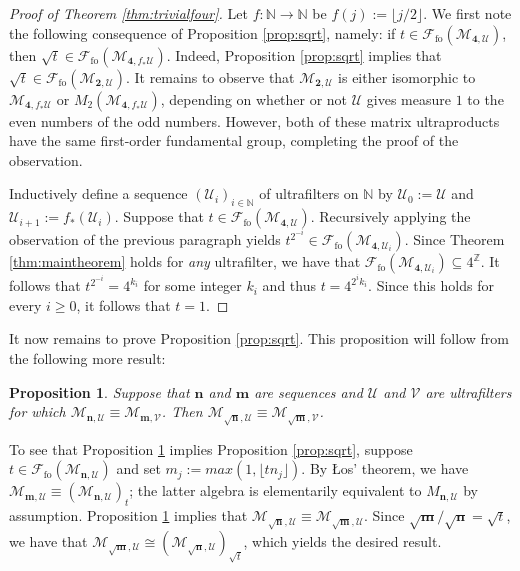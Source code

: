 \documentclass[12pt]{amsart}
\numberwithin{equation}{section}
\newtheorem{prop}[thm]{Proposition}
\theoremstyle{definition}
\newcommand{\N}{\mathbb{N}}
\newcommand{\Z}{\mathbb{Z}}
\def\cal{\mathcal}
\def\M{\mathcal{M}}
\newcommand\cU{{\cal U}}
\def \M{\mathcal{M}}
\begin{document}
\begin{proof}[Proof of Theorem \ref{thm:trivialfour}]
Let $f:\N\to \N$ be $f(j):=\lfloor j/2\rfloor$.  We first note the following consequence of Proposition \ref{prop:sqrt}, namely:  if $t\in \mathcal{F}_{\operatorname{fo}}(\M_{\mathbf{4},\cU})$, then $\sqrt{t}\in \mathcal{F}_{\operatorname{fo}}(\M_{\mathbf{4},f_*\cU})$.  Indeed, Proposition \ref{prop:sqrt} implies that $\sqrt{t}\in \mathcal{F}_{\operatorname{fo}}(\M_{\mathbf{2},\cU})$.  It remains to observe that $\M_{\mathbf{2},\cU}$ is either isomorphic to $\M_{\mathbf{4},f_*\cU}$ or $M_2(\M_{\mathbf{4},f_*\cU})$, depending on whether or not $\cU$ gives measure $1$ to the even numbers of the odd numbers.  However, both of these matrix ultraproducts have the same first-order fundamental group, completing the proof of the observation.

Inductively define a sequence $(\cU_i)_{i\in \N}$ of ultrafilters on $\N$ by $\cU_0:=\cU$ and $\cU_{i+1}:=f_*(\cU_i)$.  Suppose that $t\in \mathcal{F}_{\operatorname{fo}}(\M_{\mathbf{4},\cU})$.  Recursively applying the observation of the previous paragraph yields $t^{2^{-i}}\in \mathcal{F}_{\operatorname{fo}}(\M_{\mathbf{4},\cU_i})$.  Since Theorem \ref{thm:maintheorem} holds for \emph{any} ultrafilter, we have that $\mathcal{F}_{\operatorname{fo}}(\M_{\mathbf{4},\cU_i})\subseteq 4^\Z$.  It follows that $t^{2^{-i}}=4^{k_i}$ for some integer $k_i$ and thus $t=4^{2^ik_i}$.  Since this holds for every $i\geq 0$, it follows that $t=1$.    
\end{proof}

It now remains to prove Proposition \ref{prop:sqrt}.  This proposition will follow from the following more result:

\begin{prop}\label{prop:sqrtpreserve}
Suppose that $\mathbf{n}$ and $\mathbf{m}$ are sequences and $\cU$ and $\mathcal{V}$ are ultrafilters for which $\M_{\mathbf{n},\cU}\equiv \M_{\mathbf{m},\mathcal{V}}$.  Then $\M_{\sqrt{\mathbf{n}},\cU}\equiv \M_{\sqrt{\mathbf{m}},\mathcal{V}}$.
\end{prop}

To see that Proposition \ref{prop:sqrtpreserve} implies Proposition \ref{prop:sqrt}, suppose $t\in \mathcal{F}_{\operatorname{fo}}(\M_{\mathbf{n},\cU})$ and set $m_j:=max(1,\lfloor tn_j\rfloor)$.  By \L os' theorem, we have $\M_{\mathbf{m},\cU}\equiv (\M_{\mathbf{n},\cU})_t$; the latter algebra is elementarily equivalent to $M_{\mathbf{n},\cU}$ by assumption.  Proposition \ref{prop:sqrtpreserve} implies that $\M_{\sqrt{\mathbf{n}},\cU}\equiv \M_{\sqrt{\mathbf{m}},\mathcal{U}}$.  Since $\sqrt{\mathbf{m}}/\sqrt{\mathbf{n}}=\sqrt{t}$, we have that $\M_{\sqrt{\mathbf{m}},\cU}\cong (\M_{\sqrt{\mathbf{n}},\mathcal{U}})_{\sqrt{t}}$, which yields the desired result.
\end{document}

